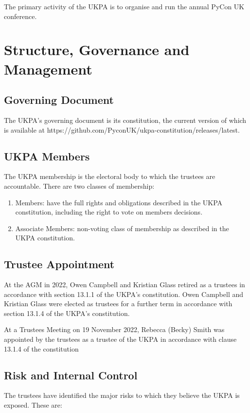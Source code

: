 \documentclass[11pt, final]{article}
\begin{document}
The primary activity of the UKPA is to organise and run the annual PyCon UK conference.

\section{Structure, Governance and Management}

\subsection{Governing Document}
The UKPA's governing document is its constitution, the current version of which is available at https://github.com/PyconUK/ukpa-constitution/releases/latest.

\subsection{UKPA Members}
The UKPA membership is the electoral body to which the trustees are accountable.
There are two classes of membership:

\begin{enumerate}
	\item Members: have the full rights and obligations described in the UKPA constitution, including the right to vote on members decisions.
	\item Associate Members: non-voting class of membership as described in the UKPA constitution.
\end{enumerate}

\subsection{Trustee Appointment}
At the AGM in 2022, Owen Campbell and Kristian Glass retired as a trustees in accordance with section 13.1.1 of the UKPA's constitution.
Owen Campbell and Kristian Glass were elected as trustees for a further term in accordance with section 13.1.4 of the UKPA's constitution.

At a Trustees Meeting on 19 November 2022, Rebecca (Becky) Smith was appointed by the trustees as a trustee of the UKPA in accordance with clause 13.1.4 of the constitution

\subsection{Risk and Internal Control}
The trustees have identified the major risks to which they believe the UKPA is exposed. These are:
\end{document}
